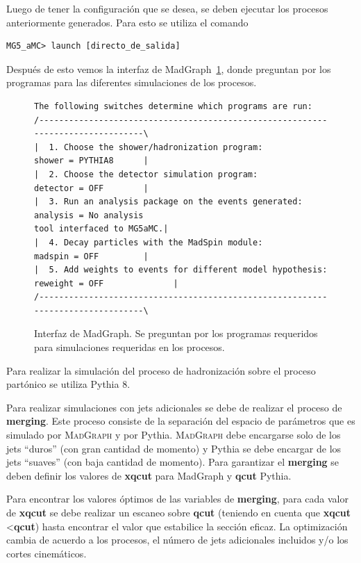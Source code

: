 Luego de tener la configuración que se desea, se deben ejecutar los procesos anteriormente generados. Para esto se utiliza el comando
%
\begin{verbatim}
MG5_aMC> launch [directo_de_salida]
\end{verbatim}
%
Después de esto vemos la interfaz de MadGraph~\ref{Fig:IMG}, donde preguntan por los programas para las diferentes simulaciones de los procesos. 
%
\begin{figure}
\begin{center}
\begin{verbatim}
The following switches determine which programs are run:
/--------------------------------------------------------------------------------\
|  1. Choose the shower/hadronization program:           shower = PYTHIA8      |
|  2. Choose the detector simulation program:            detector = OFF        |
|  3. Run an analysis package on the events generated:   analysis = No analysis 
tool interfaced to MG5aMC.|
|  4. Decay particles with the MadSpin module:		      	   madspin = OFF         |
|  5. Add weights to events for different model hypothesis:		   reweight = OFF              |
/--------------------------------------------------------------------------------\
\end{verbatim}
\caption{Interfaz de MadGraph. Se preguntan por los programas requeridos para simulaciones requeridas en los procesos.}
\label{Fig:IMG}
\end{center}
\end{figure}
%
Para realizar la simulación del proceso de hadronización sobre el proceso partónico se utiliza Pythia 8. 

Para realizar simulaciones con jets adicionales se debe de realizar el proceso de \textbf{merging}. Este proceso consiste de la separación del espacio de parámetros que es simulado por \textsc{MadGraph} y por Pythia. \textsc{MadGraph} debe encargarse solo de los jets “duros” (con gran cantidad de momento) y Pythia se debe encargar de los jets “suaves” (con baja cantidad de momento). Para garantizar el \textbf{merging} se deben definir los valores de \textbf{xqcut} para MadGraph y \textbf{qcut} Pythia. 

Para encontrar los valores óptimos de las variables de \textbf{merging}, para cada valor de \textbf{xqcut} se debe realizar un escaneo sobre \textbf{qcut} (teniendo en cuenta que \textbf{xqcut} \textless \textbf{qcut}) hasta encontrar el valor que estabilice la sección eficaz. La optimización cambia de acuerdo a los procesos, el número de jets adicionales incluidos y/o los cortes cinemáticos.

